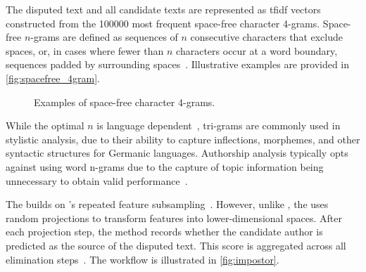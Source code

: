 The disputed text and all candidate texts are represented as \ac{tfidf} vectors constructed from the \num{100000} most frequent space-free character 4-grams. 
Space-free $n$-grams are defined as sequences of $n$ consecutive characters that exclude spaces, or, in cases where fewer than $n$ characters occur at a word boundary, sequences padded by surrounding spaces~\citep{koppel_authorship_2011,neal_surveying_2018}. 
Illustrative examples are provided in \autoref{fig:spacefree_4gram}.

\begin{figure}[ht]
    \centering
    \caption{Examples of space-free character 4-grams.}
    \label{fig:spacefree_4gram}
\end{figure}

While the optimal $n$ is language dependent~\citep{neal_surveying_2018}, tri-grams are commonly used in stylistic analysis, due to their ability to capture inflections, %
morphemes, %
and other syntactic structures for Germanic languages.
Authorship analysis typically opts against using word n-grams due to the capture of topic information being unnecessary to obtain valid performance~\citep{Sapkota_ngrams_2015}.


The \impAppr{} builds on \unmasking{}'s repeated feature subsampling~\citep{koppel_authorship_2004}. 
However, unlike \unmasking{}, the \impAppr{} uses random projections to transform features into lower-dimensional spaces.
After each projection step, the method records whether the candidate author is predicted as the source of the disputed text. 
This score is aggregated across all elimination steps~\citep{tyo_state_2022}.
The workflow is illustrated in \autoref{fig:impostor}.

